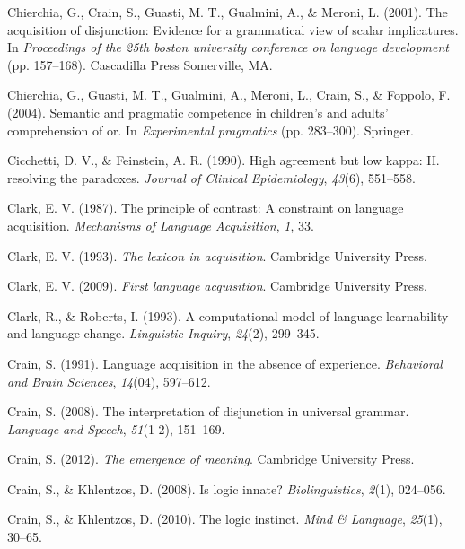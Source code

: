 \documentclass[oneside]{report}
\theoremstyle{definition}
\theoremstyle{definition}
\theoremstyle{definition}
\theoremstyle{remark}
\begin{document}
\hypertarget{ref-chierchia2001acquisition}{}
Chierchia, G., Crain, S., Guasti, M. T., Gualmini, A., \& Meroni, L.
(2001). The acquisition of disjunction: Evidence for a grammatical view
of scalar implicatures. In \emph{Proceedings of the 25th boston
university conference on language development} (pp. 157--168).
Cascadilla Press Somerville, MA.

\hypertarget{ref-chierchia2004semantic}{}
Chierchia, G., Guasti, M. T., Gualmini, A., Meroni, L., Crain, S., \&
Foppolo, F. (2004). Semantic and pragmatic competence in children's and
adults' comprehension of or. In \emph{Experimental pragmatics} (pp.
283--300). Springer.

\hypertarget{ref-cicchetti1990high}{}
Cicchetti, D. V., \& Feinstein, A. R. (1990). High agreement but low
kappa: II. resolving the paradoxes. \emph{Journal of Clinical
Epidemiology}, \emph{43}(6), 551--558.

\hypertarget{ref-clark1987principle}{}
Clark, E. V. (1987). The principle of contrast: A constraint on language
acquisition. \emph{Mechanisms of Language Acquisition}, \emph{1}, 33.

\hypertarget{ref-clark1993lexicon}{}
Clark, E. V. (1993). \emph{The lexicon in acquisition}. Cambridge
University Press.

\hypertarget{ref-clark2009first}{}
Clark, E. V. (2009). \emph{First language acquisition}. Cambridge
University Press.

\hypertarget{ref-clark1993computational}{}
Clark, R., \& Roberts, I. (1993). A computational model of language
learnability and language change. \emph{Linguistic Inquiry},
\emph{24}(2), 299--345.

\hypertarget{ref-crain1991language}{}
Crain, S. (1991). Language acquisition in the absence of experience.
\emph{Behavioral and Brain Sciences}, \emph{14}(04), 597--612.

\hypertarget{ref-crain2008interpretation}{}
Crain, S. (2008). The interpretation of disjunction in universal
grammar. \emph{Language and Speech}, \emph{51}(1-2), 151--169.

\hypertarget{ref-crain2012emergence}{}
Crain, S. (2012). \emph{The emergence of meaning}. Cambridge University
Press.

\hypertarget{ref-crain2008logic}{}
Crain, S., \& Khlentzos, D. (2008). Is logic innate?
\emph{Biolinguistics}, \emph{2}(1), 024--056.

\hypertarget{ref-crain2010logic}{}
Crain, S., \& Khlentzos, D. (2010). The logic instinct. \emph{Mind \&
Language}, \emph{25}(1), 30--65.
\end{document}
